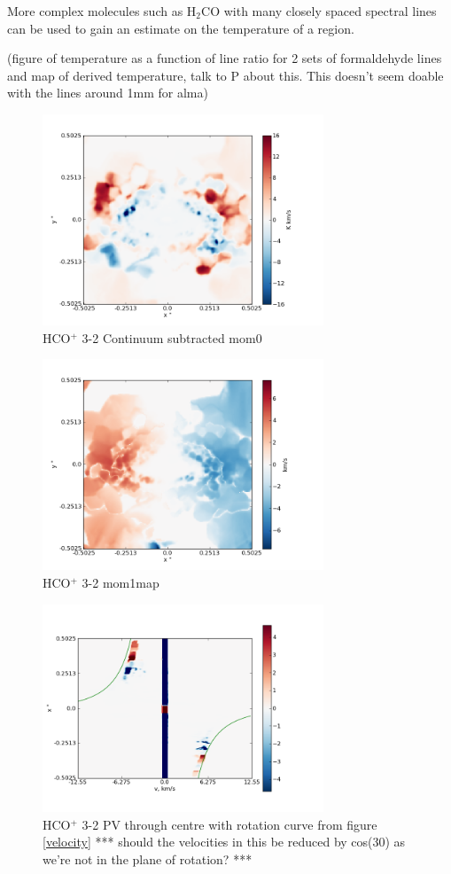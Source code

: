 \documentclass[useAMS,usenatbib]{mn2e}
\begin{document}
More complex molecules such as H$_2$CO with many closely spaced spectral lines can be used to gain an estimate on the temperature of a region. 

(figure of temperature as a function of line ratio for 2 sets of formaldehyde lines and map of derived temperature, talk to P about this. This doesn't seem doable with the lines around 1mm for alma)\newline

\begin{figure}
 \includegraphics[width=84mm]{Figures/sim/imageHCOp_3-2_30deg_contSub.png}

 \caption{HCO$^+$ 3-2 Continuum subtracted mom0}
\end{figure}

\begin{figure}
 \includegraphics[width=84mm]{Figures/sim/imageHCOp_3-2_30deg_mom1.png}

 \caption{HCO$^+$ 3-2 mom1map}
\end{figure}

\begin{figure}
 \includegraphics[width=84mm]{Figures/sim/imageHCOp_3-2_30deg_PV_centre_2.png}

 \caption{HCO$^+$ 3-2 PV through centre with rotation curve from figure \ref{velocity} *** should the velocities in this be reduced by cos(30) as we're not in the plane of rotation? ***}
\end{figure}
\end{document}
